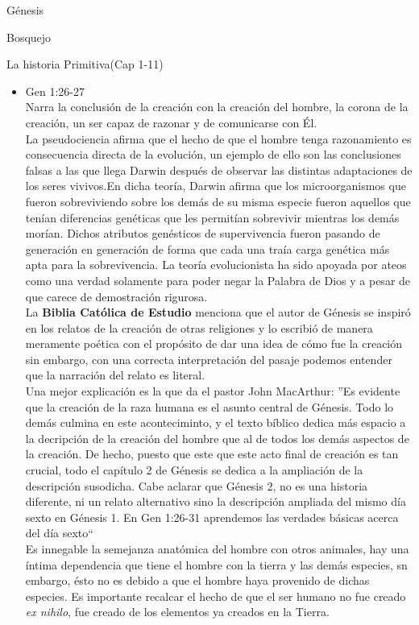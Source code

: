 \begin{section}{Génesis}
\begin{subsection}{Bosquejo}
\begin{subsubsection}{La historia Primitiva(Cap 1-11)}
\begin{enumerate}
\begin{itemize}
				\item Gen 1:26-27\\
				Narra la conclusión de la creación con la creación del hombre, la corona de la creación, un ser capaz de razonar y de comunicarse con Él.\\
			La pseudociencia afirma que el hecho de que el hombre tenga razonamiento es consecuencia directa de la evolución, un ejemplo de ello son las conclusiones falsas a las que llega Darwin después de observar las distintas adaptaciones de los seres vivivos.En dicha teoría, Darwin afirma que los microorganismos que fueron sobreviviendo sobre los demás de su misma especie fueron aquellos que tenían diferencias genéticas que les permitían sobrevivir mientras los demás morían. Dichos atributos genésticos de supervivencia fueron pasando de generación en generación de forma que cada una traía carga genética más apta para la sobrevivencia.\newpage
					La teoría evolucionista ha sido apoyada por ateos como una verdad solamente para poder 						negar la Palabra de Dios y a pesar de que carece de demostración rigurosa.\\
La \textbf{Biblia Católica de Estudio} menciona que el autor de Génesis se inspiró en los relatos de la creación de otras religiones y lo escribió de manera meramente poética con el propósito de dar una idea de cómo fue la creación sin embargo, con una correcta interpretación del pasaje podemos entender que la narración del relato es literal.\\
				Una mejor explicación es la que da el pastor John MacArthur:
					''Es evidente que la creación de la raza humana es el asunto central de Génesis. Todo lo demás 						culmina en este aconteciminto, y el texto bíblico dedica más espacio a la decripción de la 						creación del hombre que al de todos los demás aspectos de la creación. De hecho, puesto que 						este que este acto final de creación es tan crucial, todo el capítulo 2 de Génesis se dedica 						a la ampliación de la descripción susodicha. Cabe aclarar que Génesis 2, no es una historia 						diferente, ni un relato alternativo sino la descripción ampliada del mismo día sexto en 						Génesis 1. En Gen 1:26-31 aprendemos las verdades básicas acerca del día sexto``\\
Es innegable la semejanza anatómica del hombre con otros animales, hay una íntima dependencia que tiene el hombre con la tierra y las demás especies, sn embargo, ésto no es debido a que el hombre haya provenido de dichas especies. Es importante recalcar el hecho de que el ser humano no fue creado \textit{ex nihilo}, fue creado de los elementos ya creados en la Tierra.\\

\end{itemize}
\end{enumerate}
\end{subsubsection}
\end{subsection}
\end{section}
